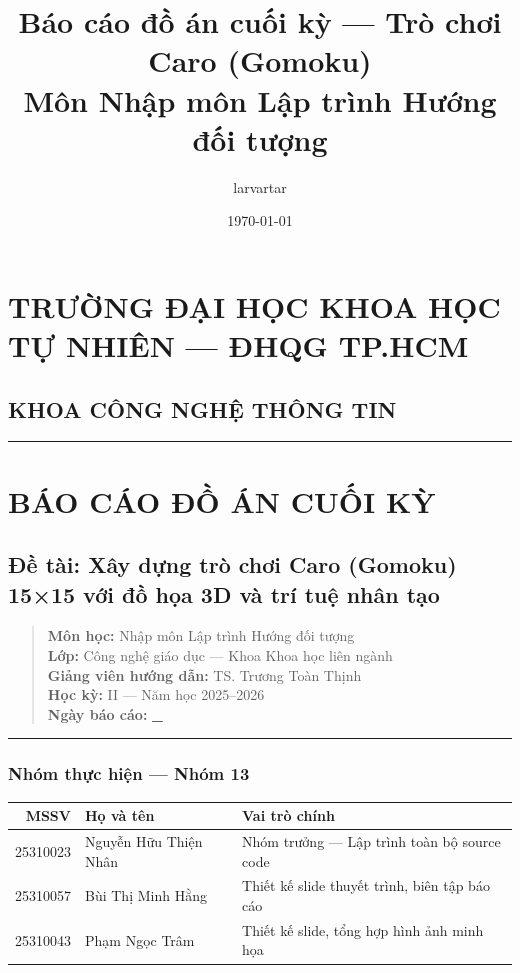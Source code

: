\documentclass[11pt,a4paper]{article}
\author{larvartar}
\date{\today}
\title{Báo cáo đồ án cuối kỳ — Trò chơi Caro (Gomoku)\\\medskip
\large Môn Nhập môn Lập trình Hướng đối tượng}
\begin{document}
\maketitle
\tableofcontents

\section{TRƯỜNG ĐẠI HỌC KHOA HỌC TỰ NHIÊN — ĐHQG TP.HCM}
\label{sec:org898178e}

\subsection{KHOA CÔNG NGHỆ THÔNG TIN}
\label{sec:orgc9e3566}

\noindent\rule{\textwidth}{0.5pt}
\section{BÁO CÁO ĐỒ ÁN CUỐI KỲ}
\label{sec:orgd75de68}

\subsection{Đề tài: Xây dựng trò chơi \textbf{Caro (Gomoku)} 15×15 với đồ họa 3D và trí tuệ nhân tạo}
\label{sec:orgade2e9d}

\begin{verse}
\textbf{Môn học:} Nhập môn Lập trình Hướng đối tượng\\
\textbf{Lớp:} Công nghệ giáo dục — Khoa Khoa học liên ngành\\
\textbf{Giảng viên hướng dẫn:} TS. Trương Toàn Thịnh\\
\textbf{Học kỳ:} II — Năm học 2025–2026\\
\textbf{Ngày báo cáo:} \uline{\uline{\_}}\\
\end{verse}

\noindent\rule{\textwidth}{0.5pt}
\subsubsection{Nhóm thực hiện — Nhóm 13}
\label{sec:org983d166}

\begin{center}
\begin{tabular}{rll}
MSSV & Họ và tên & Vai trò chính\\
\hline
25310023 & Nguyễn Hữu Thiện Nhân & Nhóm trưởng — Lập trình toàn bộ source code\\
25310057 & Bùi Thị Minh Hằng & Thiết kế slide thuyết trình, biên tập báo cáo\\
25310043 & Phạm Ngọc Trâm & Thiết kế slide, tổng hợp hình ảnh minh họa\\
\end{tabular}
\end{center}
\end{document}
